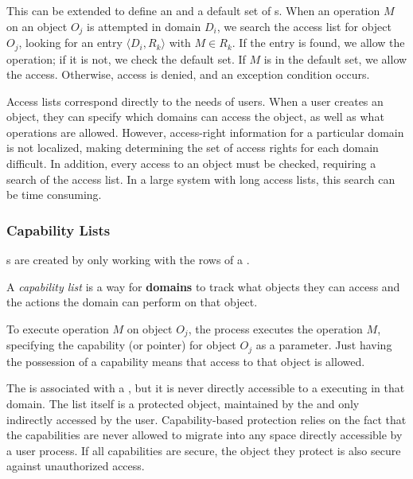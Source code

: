 This can be extended to define an  and a default set of s.
When an operation $M$ on an object $O_{j}$ is attempted in domain $D_{i}$, we search the access list for object $O_{j}$, looking for an entry $\langle D_{i}, R_{k} \rangle$ with $M \in R_{k}$.
If the entry is found, we allow the operation; if it is not, we check the default set.
If $M$ is in the default set, we allow the access.
Otherwise, access is denied, and an exception condition occurs.

Access lists correspond directly to the needs of users.
When a user creates an object, they can specify which domains can access the object, as well as what operations are allowed.
However, access-right information for a particular domain is not localized, making determining the set of access rights for each domain difficult.
In addition, every access to an object must be checked, requiring a search of the access list.
In a large system with long access lists, this search can be time consuming.

\subsubsection{Capability Lists}\label{subsubsec:Capability_Lists}
s are created by only working with the rows of a .

\begin{definition}\label{def:Capability_List}
  A \emph{capability list} is a way for \textbf{domains} to track what objects they can access and the actions the domain can perform on that object.
\end{definition}

To execute operation $M$ on object $O_{j}$, the process executes the operation $M$, specifying the capability (or pointer) for object $O_{j}$ as a parameter.
Just having the possession of a capability means that access to that object is allowed.

The  is associated with a , but it is never directly accessible to a  executing in that domain.
The list itself is a protected object, maintained by the  and only indirectly accessed by the user.
Capability-based protection relies on the fact that the capabilities are never allowed to migrate into any space directly accessible by a user process.
If all capabilities are secure, the object they protect is also secure against unauthorized access.

